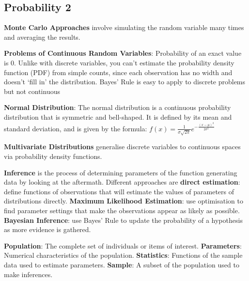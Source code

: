 \documentclass{article}
\begin{document}
\subsection*{Probability 2}


\noindent \textbf{Monte Carlo Approaches} involve simulating the random variable many times and averaging the results.


\noindent \textbf{Problems of Continuous Random Variables}:
Probability of an exact value is 0.
Unlike with discrete variables, you can't estimate the probability density function (PDF) from simple counts,
since each observation has no width and doesn't `fill in' the distribution.
Bayes' Rule is easy to apply to discrete problems but not continuous


\noindent \textbf{Normal Distribution}:
The normal distribution is a continuous probability distribution that is symmetric and bell-shaped.
It is defined by its mean and standard deviation, and is given by the formula:
$ f(x) = \frac{1}{\sigma \sqrt{2\pi}} e^{-\frac{(x-\mu)^2}{2\sigma^2}} $



\noindent \textbf{Multivariate Distributions} generalise discrete variables to continuous spaces via probability density functions.


\noindent \textbf{Inference} is the process of determining parameters of the function generating data by looking at the aftermath.
Different approaches are \textbf{direct estimation}: define functions of observations that will estimate the values of parameters
of distributions directly.
\textbf{Maximum Likelihood Estimation}: use optimisation to find parameter settings that make the observations appear as likely as possible.
\textbf{Bayesian Inference}: use Bayes' Rule to update the probability of a hypothesis as more evidence is gathered.


\noindent \textbf{Population}: The complete set of individuals or items of interest.
\textbf{Parameters}: Numerical characteristics of the population.
\textbf{Statistics}: Functions of the sample data used to estimate parameters.
\textbf{Sample}: A subset of the population used to make inferences.
\end{document}
